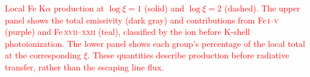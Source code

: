 \caption{\textcolor{red}{Local Fe K$\alpha$ production at $\log\xi=1$
(solid) and $\log\xi=2$ (dashed). The upper panel shows the total
emissivity (dark gray) and contributions from Fe\,\textsc{i}--\textsc{v}
(purple) and Fe\,\textsc{xvii}--\textsc{xxii} (teal), classified by
the ion before K-shell photoionization. The lower panel shows each
group's percentage of the local total at the corresponding $\xi$.
These quantities describe production before radiative transfer,
rather than the escaping line flux.}}
\label{fig:fe_kalpha_production_logxi12}
